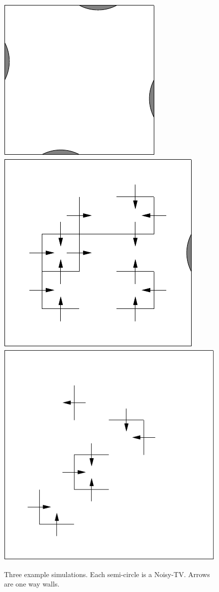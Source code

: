 \documentclass[12pt]{thesis}
\begin{document}
\begin{figure}
	\begin{center}
		\includegraphics[scale=0.75]{"images/4-TV.pdf"}
		\includegraphics[scale=0.75]{"images/1-TV.pdf"}
		\includegraphics[scale=0.75]{"images/No-TV.pdf"}
	\end{center}
	\caption{Three example simulations. Each semi-circle is a Noisy-TV. Arrows are one way walls.}
	\label{Fig:Sim}
\end{figure}
\end{document}
